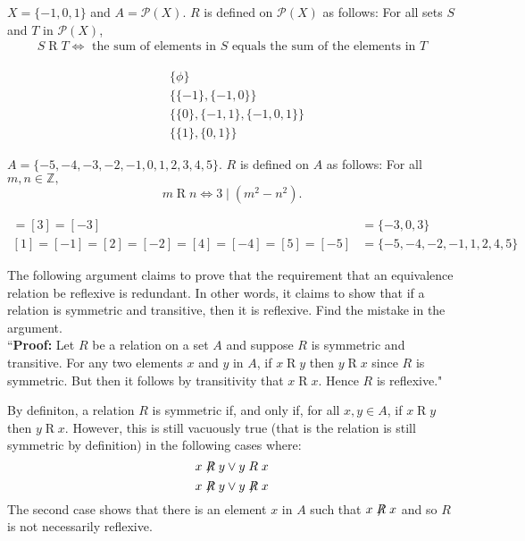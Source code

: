 \documentclass[12pt,letterpaper, onecolumn]{exam}
\newcommand{\pnt}[1]{{\scriptstyle#1}}
\begin{document}
	\begin{questions}
		\setcounter{question}{8}\question $X=\{-1,0,1\}$ and $A=\mathscr{P}(X)$. $R$ is defined on $\mathscr{P}(X)$ as follows: For all sets $\pnt{S}$ and $\pnt{T}$ in $\mathscr{P}(X)$,
		\begin{align*}
			\pnt{S}\mathrel{R}\pnt{T}\Leftrightarrow \text{ the sum of elements in $\pnt{S}$ equals the sum of the elements in $\pnt{T}$}
		\end{align*}
		\begin{solution}
			\begin{align*}
			&\{\phi\}\\
			&\{\{-1\},\{-1,0\}\}\\
			&\{\{0\},\{-1,1\},\{-1,0,1\}\}\\
			&\{\{1\},\{0,1\}\}
			\end{align*}
		\end{solution}
		\setcounter{question}{9}\question $A=\{-5,-4,-3,-2,-1,0,1,2,3,4,5\}.$ $R$ is defined on $A$ as follows: For all $m,n\in\mathbb{Z},$
		$$m\mathrel{R}n\Leftrightarrow 3\mid(m^2-n^2).$$
		\begin{solution}
			\begin{align*}
				[0]=[3]=[-3]&=\{-3,0,3\}\\
				[1]=[-1]=[2]=[-2]=[4]=[-4]=[5]=[-5]&=\{-5,-4,-2,-1,1,2,4,5\}
			\end{align*}
		\end{solution}
		\setcounter{question}{38}\question The following argument claims to prove that the requirement that an equivalence relation be reflexive is redundant. In other words, it claims to show that if a relation is symmetric and transitive, then it is reflexive. Find the mistake in the argument.\\
		``\textbf{Proof:} Let $R$ be a relation on a set $A$ and suppose $R$ is symmetric and transitive. For any two elements $x$ and $y$ in $A$, if $x\mathrel{R}y$ then $y\mathrel{R}x$ since $R$ is symmetric. But then it follows by transitivity that $x\mathrel{R}x$. Hence $R$ is reflexive."
		\begin{solution}
			By definiton, a relation $R$ is symmetric if, and only if, for all $x,y\in A$, if $x\mathrel{R}y$ then $y\mathrel{R}x$. However, this is still vacuously true (that is the relation is still symmetric by definition) in the following cases where: $$x\not\mathrel{R}y \lor y\mathrel{R}x$$
			$$x\not\mathrel{R}y \lor y\not\mathrel{R}x$$
			The second case shows that there is an element $x$ in $A$ such that $x\not\mathrel{R}x$ and so $R$ is not necessarily reflexive. 
		\end{solution}
	\end{questions}
\end{document}
